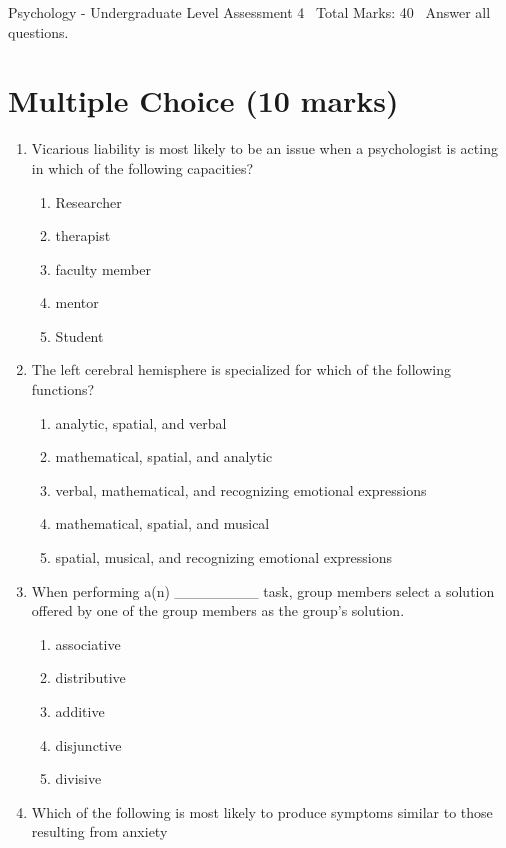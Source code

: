 \documentclass[12pt]{article}
\begin{document}
\begin{center}
Psychology - Undergraduate Level Assessment 4 \
Total Marks: 40 \
Answer all questions.
\end{center}

\section*{Multiple Choice (10 marks)}
\begin{enumerate}[label=\arabic*.]
\item Vicarious liability is most likely to be an issue when a psychologist is acting in which of the following capacities?
\begin{enumerate}[label=(\alph*)]
    \item Researcher
    \item therapist
    \item faculty member
    \item mentor
    \item Student
\end{enumerate}
\item The left cerebral hemisphere is specialized for which of the following functions?
\begin{enumerate}[label=(\alph*)]
    \item analytic, spatial, and verbal
    \item mathematical, spatial, and analytic
    \item verbal, mathematical, and recognizing emotional expressions
    \item mathematical, spatial, and musical
    \item spatial, musical, and recognizing emotional expressions
\end{enumerate}
\item When performing a(n) \_\_\_\_\_\_\_\_ task, group members select a solution offered by one of the group members as the group's solution.
\begin{enumerate}[label=(\alph*)]
    \item associative
    \item distributive
    \item additive
    \item disjunctive
    \item divisive
\end{enumerate}
\item Which of the following is most likely to produce symptoms similar to those resulting from anxiety
\begin{enumerate}[label=(\alph*)]

\end{enumerate}
\end{enumerate}
\end{document}
